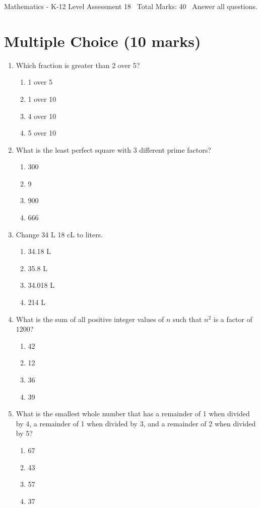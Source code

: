 \documentclass[12pt]{article}
\begin{document}
\begin{center}
Mathematics - K-12 Level Assessment 18 \
Total Marks: 40 \
Answer all questions.
\end{center}

\section*{Multiple Choice (10 marks)}
\begin{enumerate}[label=\arabic*.]
\item Which fraction is greater than 2 over 5?
\begin{enumerate}[label=(\alph*)]
    \item 1 over 5
    \item 1 over 10
    \item 4 over 10
    \item 5 over 10
\end{enumerate}
\item What is the least perfect square with 3 different prime factors?
\begin{enumerate}[label=(\alph*)]
    \item 300
    \item 9
    \item 900
    \item 666
\end{enumerate}
\item Change 34 L 18 cL to liters.
\begin{enumerate}[label=(\alph*)]
    \item 34.18 L
    \item 35.8 L
    \item 34.018 L
    \item 214 L
\end{enumerate}
\item What is the sum of all positive integer values of $n$ such that $n^2$ is a factor of $1200$?
\begin{enumerate}[label=(\alph*)]
    \item 42
    \item 12
    \item 36
    \item 39
\end{enumerate}
\item What is the smallest whole number that has a remainder of 1 when divided by 4, a remainder of 1 when divided by 3, and a remainder of 2 when divided by 5?
\begin{enumerate}[label=(\alph*)]
    \item 67
    \item 43
    \item 57
    \item 37
\end{enumerate}
\end{enumerate}
\end{document}
